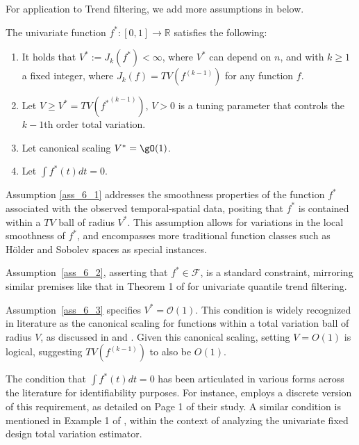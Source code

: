 \documentclass[twoside,11pt]{article}
\begin{document}
For application to Trend filtering, we add more assumptions in below. 
\begin{assumption}
\label{ass_tf}
The univariate function $f^* : [0,1] \to \mathbb{R}$ satisfies the following:
\begin{enumerate}[label={\bfseries\arabic*.}, ref={\ref{ass_tf}.\arabic*}]
\item\label{ass_6_1} It holds that $V^* := J_k(f^*) < \infty$, where $V^*$ can depend on $n$, and with $k \geq  1$ a fixed integer, where $J_k(f) =  TV(f^{(k-1)})$ for any function $f$.
\item\label{ass_6_2} Let $V \geq  V^* = TV({f^*}^{(k-1)})$, $V > 0$ is a tuning parameter that controls the $k - 1$th order total variation. 
\item\label{ass_6_3} Let canonical scaling $V^* = \gO(1)$.
\item\label{ass_6_4} Let \( \int f^*(t)dt = 0 \). 
\end{enumerate}



\end{assumption}

Assumption \ref{ass_6_1} addresses the smoothness properties of the function \(f^*\) associated with the observed temporal-spatial data, positing that \(f^*\) is contained within a \(TV\) ball of radius \(V^*\). This assumption allows for variations in the local smoothness of \(f^*\), and encompasses more traditional function classes such as Hölder and Sobolev spaces as special instances.

Assumption~\ref{ass_6_2}, asserting that \(f^* \in \mathcal{F}\), is a standard constraint, mirroring similar premises like that in Theorem 1 of \cite{madrid2022risk} for univariate quantile trend filtering.

Assumption~\ref{ass_6_3} specifies \(V^* = \mathcal{O}(1)\). This condition is widely recognized in literature as the canonical scaling for functions within a total variation ball of radius \(V\), as discussed in \cite{madrid2022risk} and \cite{sadhanala2016total}. Given this canonical scaling, setting \(V = O(1)\) is logical, suggesting \(TV(f^{(k-1)})\) to also be \(O(1)\).

The condition that \( \int f^*(t)dt = 0 \) has been articulated in various forms across the literature for identifiability purposes. For instance, \cite{sadhanala2017additive} employs a discrete version of this requirement, as detailed on Page 1 of their study. A similar condition is mentioned in Example 1 of \cite{dalalyan2017prediction}, within the context of analyzing the univariate fixed design total variation estimator.
\end{document}
